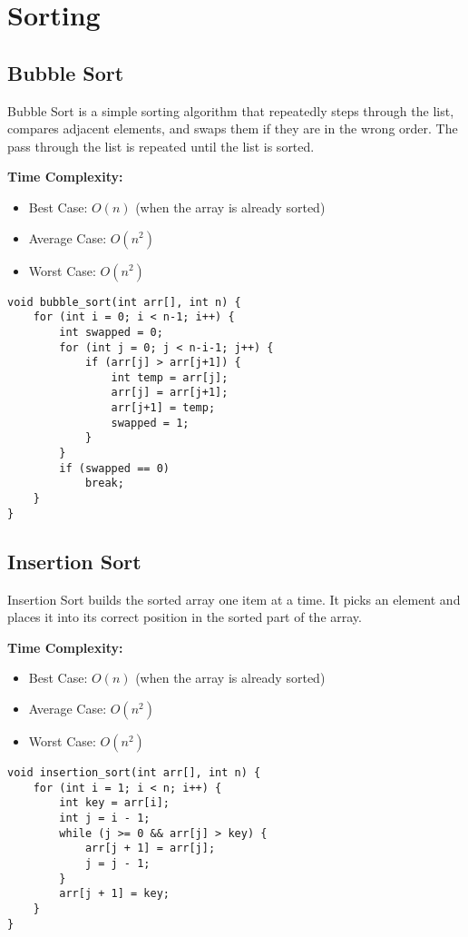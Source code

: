 \section{Sorting}
\subsection{Bubble Sort}
Bubble Sort is a simple sorting algorithm that repeatedly steps 
through the list, compares adjacent elements, and swaps them if 
they are in the wrong order. The pass through the list is repeated 
until the list is sorted.

\textbf{Time Complexity:}
\begin{itemize}
    \item Best Case: $O(n)$ (when the array is already sorted)
    \item Average Case: $O(n^2)$
    \item Worst Case: $O(n^2)$
\end{itemize}

\begin{lstlisting}[caption=Bubble Sort]
void bubble_sort(int arr[], int n) {
    for (int i = 0; i < n-1; i++) {
        int swapped = 0;
        for (int j = 0; j < n-i-1; j++) {
            if (arr[j] > arr[j+1]) {
                int temp = arr[j];
                arr[j] = arr[j+1];
                arr[j+1] = temp;
                swapped = 1;
            }
        }
        if (swapped == 0)
            break;
    }
}
\end{lstlisting}
\subsection{Insertion Sort}
Insertion Sort builds the sorted array one item at a time. 
It picks an element and places it into its correct position in 
the sorted part of the array.

\textbf{Time Complexity:}
\begin{itemize}
    \item Best Case: $O(n)$ (when the array is already sorted)
    \item Average Case: $O(n^2)$
    \item Worst Case: $O(n^2)$
\end{itemize}

\begin{lstlisting}[caption=Insertion Sort]
void insertion_sort(int arr[], int n) {
    for (int i = 1; i < n; i++) {
        int key = arr[i];
        int j = i - 1;
        while (j >= 0 && arr[j] > key) {
            arr[j + 1] = arr[j];
            j = j - 1;
        }
        arr[j + 1] = key;
    }
}
\end{lstlisting}
